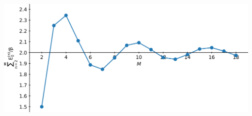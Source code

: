\documentclass[a4paper]{book}
\newcounter{exercise}[chapter]
\begin{document}
\begin{exercise}
\begin{enumerate}
	\begin{center}
	\includegraphics[scale=0.84]{./pictures/6.06/gegenbauer.png}
	\end{center}
	
	\end{enumerate}
	
	\end{exercise}
	
\end{document}
